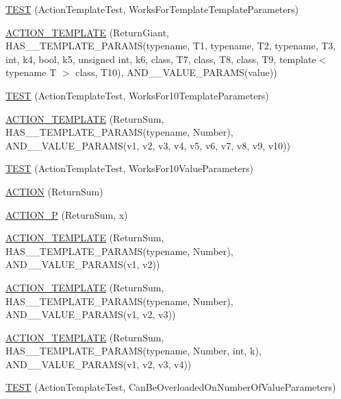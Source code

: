 \begin{DoxyCompactItemize}
\item 
\mbox{\hyperlink{namespacetesting_1_1gmock__generated__actions__test_a8908d6badc9054adebdaf5ed8d455c2d}{T\+E\+ST}} (Action\+Template\+Test, Works\+For\+Template\+Template\+Parameters)
\item 
\mbox{\hyperlink{namespacetesting_1_1gmock__generated__actions__test_aea61dba8f93605f3e8c1cdedfd1079f5}{A\+C\+T\+I\+O\+N\+\_\+\+T\+E\+M\+P\+L\+A\+TE}} (Return\+Giant, H\+A\+S\+\_\+\_\+\+T\+E\+M\+P\+L\+A\+T\+E\+\_\+\+P\+A\+R\+A\+MS(typename, T1, typename, T2, typename, T3, int, k4, bool, k5, unsigned int, k6, class, T7, class, T8, class, T9, template$<$ typename T $>$ class, T10), A\+N\+D\+\_\+\_\+\+V\+A\+L\+U\+E\+\_\+\+P\+A\+R\+A\+MS(value))
\item 
\mbox{\hyperlink{namespacetesting_1_1gmock__generated__actions__test_a39707e50b998b0866ea7dec54099f38f}{T\+E\+ST}} (Action\+Template\+Test, Works\+For10\+Template\+Parameters)
\item 
\mbox{\hyperlink{namespacetesting_1_1gmock__generated__actions__test_a0e21a6c1f43a7125a29e6e1edcd7006c}{A\+C\+T\+I\+O\+N\+\_\+\+T\+E\+M\+P\+L\+A\+TE}} (Return\+Sum, H\+A\+S\+\_\+\_\+\+T\+E\+M\+P\+L\+A\+T\+E\+\_\+\+P\+A\+R\+A\+MS(typename, Number), A\+N\+D\+\_\+\_\+\+V\+A\+L\+U\+E\+\_\+\+P\+A\+R\+A\+MS(v1, v2, v3, v4, v5, v6, v7, v8, v9, v10))
\item 
\mbox{\hyperlink{namespacetesting_1_1gmock__generated__actions__test_aa8dd9ea1777fe67626bab2815b7261f4}{T\+E\+ST}} (Action\+Template\+Test, Works\+For10\+Value\+Parameters)
\item 
\mbox{\hyperlink{namespacetesting_1_1gmock__generated__actions__test_a49c180470c75de1ab88cd2928e738d33}{A\+C\+T\+I\+ON}} (Return\+Sum)
\item 
\mbox{\hyperlink{namespacetesting_1_1gmock__generated__actions__test_acae7628c76df0e3b54ea80459fe3cf60}{A\+C\+T\+I\+O\+N\+\_\+P}} (Return\+Sum, x)
\item 
\mbox{\hyperlink{namespacetesting_1_1gmock__generated__actions__test_a0d95dcce021580cf2a2af2a91348a01b}{A\+C\+T\+I\+O\+N\+\_\+\+T\+E\+M\+P\+L\+A\+TE}} (Return\+Sum, H\+A\+S\+\_\+\_\+\+T\+E\+M\+P\+L\+A\+T\+E\+\_\+\+P\+A\+R\+A\+MS(typename, Number), A\+N\+D\+\_\+\_\+\+V\+A\+L\+U\+E\+\_\+\+P\+A\+R\+A\+MS(v1, v2))
\item 
\mbox{\hyperlink{namespacetesting_1_1gmock__generated__actions__test_a5241672e22af49093d3601ac42c9a5ca}{A\+C\+T\+I\+O\+N\+\_\+\+T\+E\+M\+P\+L\+A\+TE}} (Return\+Sum, H\+A\+S\+\_\+\_\+\+T\+E\+M\+P\+L\+A\+T\+E\+\_\+\+P\+A\+R\+A\+MS(typename, Number), A\+N\+D\+\_\+\_\+\+V\+A\+L\+U\+E\+\_\+\+P\+A\+R\+A\+MS(v1, v2, v3))
\item 
\mbox{\hyperlink{namespacetesting_1_1gmock__generated__actions__test_a03e55dabaa60ff2cda602c702ef3ff76}{A\+C\+T\+I\+O\+N\+\_\+\+T\+E\+M\+P\+L\+A\+TE}} (Return\+Sum, H\+A\+S\+\_\+\_\+\+T\+E\+M\+P\+L\+A\+T\+E\+\_\+\+P\+A\+R\+A\+MS(typename, Number, int, k), A\+N\+D\+\_\+\_\+\+V\+A\+L\+U\+E\+\_\+\+P\+A\+R\+A\+MS(v1, v2, v3, v4))
\item 
\mbox{\hyperlink{namespacetesting_1_1gmock__generated__actions__test_aa84c5b4f29e052340459e12649ce7209}{T\+E\+ST}} (Action\+Template\+Test, Can\+Be\+Overloaded\+On\+Number\+Of\+Value\+Parameters)
\end{DoxyCompactItemize}
